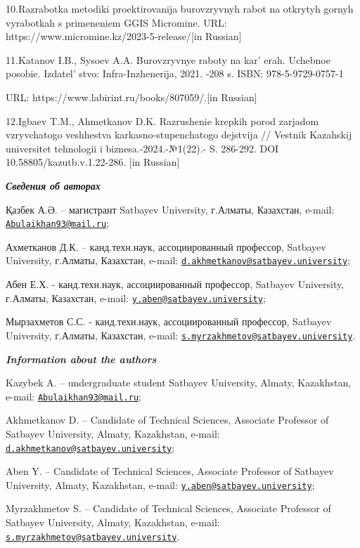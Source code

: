 10.Razrabotka metodiki proektirovanija burovzryvnyh rabot na otkrytyh
gornyh vyrabotkah s primeneniem GGIS Micromine. URL:
https://www.micromine.kz/2023-5-release/{[}in Russian{]}

11.Katanov I.B., Sysoev A.A. Burovzryvnye raboty na
kar' erah. Uchebnoe posobie.
Izdatel' stvo: Infra-Inzhenerija, 2021. -208 s. ISBN:
978-5-9729-0757-1

URL: https://www.labirint.ru/books/807059/.{[}in Russian{]}

12.Igbaev T.M., Ahmetkanov D.K. Razrushenie krepkih porod zarjadom
vzryvchatogo veshhestva karkasno-stupenchatogo dejstvija // Vestnik
Kazahskij universitet tehnologii i biznesa.-2024.-№1(22).- S. 286-292.
DOI 10.58805/kazutb.v.1.22-286. {[}in Russian{]}

\emph{{\bfseries Сведения об авторах}}

Қазбек А.Ә. -- магистрант Satbayev University, г.Алматы, Казахстан,
e-mail:
\href{mailto:Abulaikhan93@mail.ru}{\nolinkurl{Abulaikhan93@mail.ru}};

Ахметканов Д.К. -- канд.техн.наук, ассоциированный профессор, Satbayev
University, г.Алматы, Казахстан, e-mail:
\href{mailto:d.akhmetkanov@satbayev.university}{\nolinkurl{d.akhmetkanov@satbayev.university}};

Абен Е.Х. - канд.техн.наук, ассоциированный профессор, Satbayev
University, г.Алматы, Казахстан, e-mail:
\href{mailto:y.aben@satbayev.university}{\nolinkurl{y.aben@satbayev.university}};

Мырзахметов С.С. - канд.техн.наук, ассоциированный профессор, Satbayev
University, г.Алматы, Казахстан, e-mail:
\href{mailto:s.myrzakhmetov@satbayev.university}{\nolinkurl{s.myrzakhmetov@satbayev.university}}.

\emph{{\bfseries Information about the authors}}

Kazybek A. -- undergraduate student Satbayev University, Almaty,
Kazakhstan, e-mail:
\href{mailto:Abulaikhan93@mail.ru}{\nolinkurl{Abulaikhan93@mail.ru}};

Akhmetkanov D. -- Candidate of Technical Sciences, Associate Professor
of Satbayev University, Almaty, Kazakhstan, e-mail:
\href{mailto:d.akhmetkanov@satbayev.university}{\nolinkurl{d.akhmetkanov@satbayev.university}};

Aben Y. -- Candidate of Technical Sciences, Associate Professor of
Satbayev University, Almaty, Kazakhstan, e-mail:
\href{mailto:y.aben@satbayev.university}{\nolinkurl{y.aben@satbayev.university}};

Myrzakhmetov S. -- Candidate of Technical Sciences, Associate Professor
of Satbayev University, Almaty, Kazakhstan, e-mail:
\href{mailto:s.myrzakhmetov@satbayev.university}{\nolinkurl{s.myrzakhmetov@satbayev.university}}.